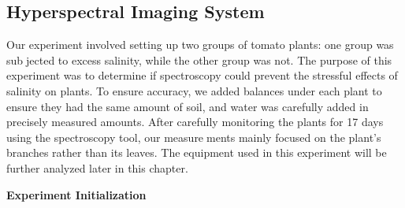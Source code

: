 \documentclass{article}
\begin{document}
{            \subsection{Hyperspectral Imaging System }
                    \hspace{0.5cm}Our experiment involved setting up two groups of tomato plants: one group was subjected to excess salinity, while the other group was not. The purpose of this experiment was to determine if spectroscopy could prevent the stressful effects of salinity on plants. To ensure accuracy, we added balances under each plant to ensure they had the same amount of soil, and water was carefully added in precisely measured amounts. After carefully monitoring the plants for 17 days using the spectroscopy tool, our measurements mainly focused on the plant’s branches rather than its leaves. The equipment used in this experiment will be further analyzed later in this chapter.
                    \vspace*{1\baselineskip}
                    
                    \textbf{Experiment Initialization}
                    \vspace*{1\baselineskip}
                    
}
\end{document}
